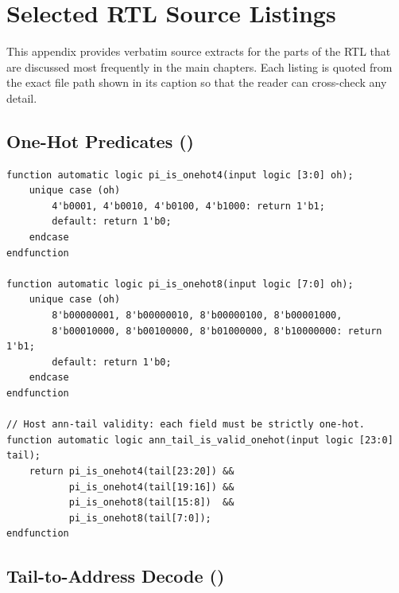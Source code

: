 
\chapter{Selected RTL Source Listings}
\label{app:listings}

This appendix provides verbatim source extracts for the parts of the
RTL that are discussed most frequently in the main chapters. Each
listing is quoted from the exact file path shown in its caption so
that the reader can cross-check any detail.

\section{One-Hot Predicates ()}
\label{app:listing-onehot}

\begin{lstlisting}[style=svstyle,
    caption={One-hot structural predicates and tail validity, from
             \sv{source/Parallel\_Interface/parallel\_interface\_pkg.sv}.},
    label={lst:onehot}]
function automatic logic pi_is_onehot4(input logic [3:0] oh);
    unique case (oh)
        4'b0001, 4'b0010, 4'b0100, 4'b1000: return 1'b1;
        default: return 1'b0;
    endcase
endfunction

function automatic logic pi_is_onehot8(input logic [7:0] oh);
    unique case (oh)
        8'b00000001, 8'b00000010, 8'b00000100, 8'b00001000,
        8'b00010000, 8'b00100000, 8'b01000000, 8'b10000000: return 1'b1;
        default: return 1'b0;
    endcase
endfunction

// Host ann-tail validity: each field must be strictly one-hot.
function automatic logic ann_tail_is_valid_onehot(input logic [23:0] tail);
    return pi_is_onehot4(tail[23:20]) &&
           pi_is_onehot4(tail[19:16]) &&
           pi_is_onehot8(tail[15:8])  &&
           pi_is_onehot8(tail[7:0]);
endfunction
\end{lstlisting}

\section{Tail-to-Address Decode ()}
\label{app:listing-addr-decode}

